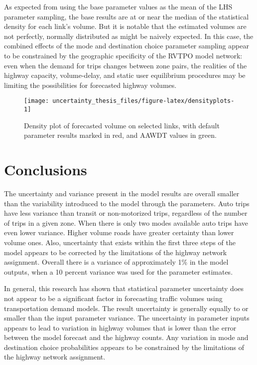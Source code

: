 \documentclass[fancy, masters, twoside]{byuthesis}
\begin{document}
As expected from using the base parameter values as the mean of the LHS parameter sampling, the base results are at or near the median of the statistical density for each link's volume. But it is notable that the estimated volumes are not perfectly, normally distributed as might be naively expected. In this case, the combined effects of the mode and destination choice parameter sampling appear to be constrained by the geographic specificity of the RVTPO model network: even when the demand for trips changes between zone pairs, the realities of the highway capacity, volume-delay, and static user equilibrium procedures may be limiting the possibilities for forecasted highway volumes.

\begin{sidewaysfigure}

{\centering \texttt{[image: uncertainty\_thesis\_files/figure-latex/densityplots-1]} 

}

\caption{Density plot of forecasted volume on selected links, with default parameter results marked in red, and AAWDT values in green.}\label{fig:densityplots}
\end{sidewaysfigure}

\hypertarget{conclusions}{%
\chapter{Conclusions}\label{conclusions}}

The uncertainty and variance present in the model results are overall smaller than the variability introduced to the model through the parameters. Auto trips have less variance than transit or non-motorized trips, regardless of the number of trips in a given zone. When there is only two modes available auto trips have even lower variance. Higher volume roads have greater certainty than lower volume ones. Also, uncertainty that exists within the first three steps of the model appears to be corrected by the limitations of the highway network assignment. Overall there is a variance of approximately 1\% in the model outputs, when a 10 percent variance was used for the parameter estimates.

In general, this research has shown that statistical parameter uncertainty does not appear to be a significant factor in forecasting traffic volumes using transportation demand models. The result uncertainty is generally equally to or smaller than the input parameter variance. The uncertainty in parameter inputs appears to lead to variation in highway volumes that is lower than the error between the model forecast and the highway counts. Any variation in mode and destination choice probabilities appears to be constrained by the limitations of the highway network assignment.
\end{document}
